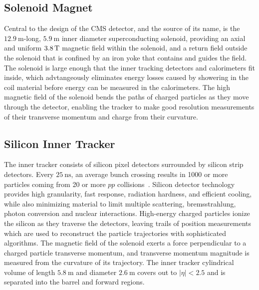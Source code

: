 \subsection{Solenoid Magnet}
Central to the design of the CMS detector, and the source of its name, is the $\SI{12.9}{\m}$-long, $\SI{5.9}{\m}$ inner diameter superconducting solenoid, providing an axial and uniform $\SI{3.8}{\T}$ magnetic field within the solenoid, and a return field outside the solenoid that is confined by an iron yoke that contains and guides the field.
The solenoid is large enough that the inner tracking detectors and calorimeters fit inside, which advtangeously eliminates energy losses caused by showering in the coil material before energy can be measured in the calorimeters.
The high magnetic field of the solenoid bends the paths of charged particles as they move through the detector, enabling the tracker to make good resolution measurements of their transverse momentum and charge from their curvature.

\subsection{Silicon Inner Tracker}
The inner tracker consists of silicon pixel detectors surrounded by silicon strip detectors.
Every $\SI{25}{\ns}$, an average bunch crossing results in 1000 or more particles coming from 20 or more $pp$ collisions~\cite{Chatrchyan:1129810}.
Silicon detector technology provides high granularity, fast response, radiation hardness, and efficient cooling, while also minimizing material to limit multiple scattering, bremsstrahlung, photon conversion and nuclear interactions.
High-energy charged particles ionize the silicon as they traverse the detectors, leaving trails of position measurements which are used to reconstruct the particle trajectories with sophisticated algorithms.
The magnetic field of the solenoid exerts a force perpendicular to a charged particle transverse momentum, and transverse momentum magnitude is measured from the curvature of its trajectory.
The inner tracker cylindrical volume of length $\SI{5.8}{\m}$ and diameter $\SI{2.6}{\m}$ covers out to $\vert \eta \vert < 2.5$ and is separated into the barrel and forward regions.

